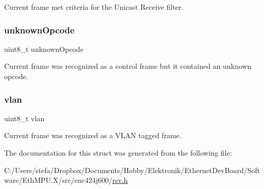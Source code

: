 Current frame met criteria for the Unicast Receive filter. 

\mbox{\label{struct_r_s_v___a57538bc935cb3aac5c51829f01b013af}} 
\subsubsection{\texorpdfstring{unknownOpcode}{unknownOpcode}}
{\footnotesize\ttfamily uint8\+\_\+t unknown\+Opcode}



Current frame was recognized as a control frame but it contained an unknown opcode. 

\mbox{\label{struct_r_s_v___a1658beabbd0704b4ab87c15e91efe371}} 
\subsubsection{\texorpdfstring{vlan}{vlan}}
{\footnotesize\ttfamily uint8\+\_\+t vlan}



Current frame was recognized as a V\+L\+AN tagged frame. 



The documentation for this struct was generated from the following file\+:\begin{DoxyCompactItemize}
\item 
C\+:/\+Users/stefa/\+Dropbox/\+Documents/\+Hobby/\+Elektronik/\+Ethernet\+Dev\+Board/\+Software/\+Eth\+M\+P\+U.\+X/src/enc424j600/\mbox{\hyperlink{rsv_8h}{rsv.\+h}}\end{DoxyCompactItemize}
